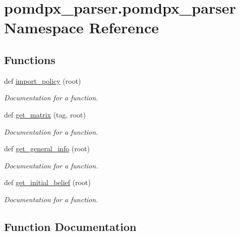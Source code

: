\hypertarget{namespacepomdpx__parser_1_1pomdpx__parser}{}\section{pomdpx\+\_\+parser.\+pomdpx\+\_\+parser Namespace Reference}
\label{namespacepomdpx__parser_1_1pomdpx__parser}
\subsection*{Functions}
\begin{DoxyCompactItemize}
\item 
def \hyperlink{namespacepomdpx__parser_1_1pomdpx__parser_a346b2df7990236faf1b7ee0170c7df1b}{import\+\_\+policy} (root)
\begin{DoxyCompactList}\small\item\em Documentation for a function. \end{DoxyCompactList}\item 
def \hyperlink{namespacepomdpx__parser_1_1pomdpx__parser_af21548a55890648ba98e94d7cfa3f9dc}{get\+\_\+matrix} (tag, root)
\begin{DoxyCompactList}\small\item\em Documentation for a function. \end{DoxyCompactList}\item 
def \hyperlink{namespacepomdpx__parser_1_1pomdpx__parser_ab3e24be8693174dfc800d57679fbe641}{get\+\_\+general\+\_\+info} (root)
\begin{DoxyCompactList}\small\item\em Documentation for a function. \end{DoxyCompactList}\item 
def \hyperlink{namespacepomdpx__parser_1_1pomdpx__parser_a0b4a4844aa05270e4658ab1c06ff8dff}{get\+\_\+initial\+\_\+belief} (root)
\begin{DoxyCompactList}\small\item\em Documentation for a function. \end{DoxyCompactList}\end{DoxyCompactItemize}


\subsection{Function Documentation}
